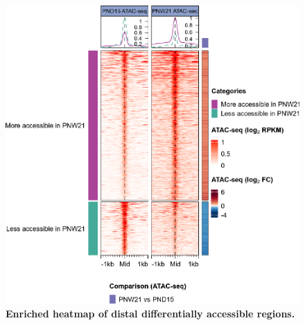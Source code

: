 \documentclass[12pt,twoside]{reedthesis}
\begin{document}
\begin{figure}[H]

{\centering \includegraphics{thesis_files/figure-latex/dn4-1} 

}

\caption[Enriched heatmap of distal DARs]{\textbf{Enriched heatmap of distal differentially accessible regions.}}\label{fig:dn4}
\end{figure}
\end{document}
